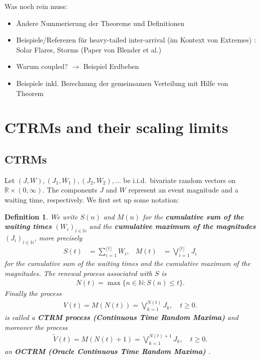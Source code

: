\documentclass[12pt, a4paper]{article}
\newtheorem{definition}[equation]{Definition}
\newcommand{\N}{\mathbb{N}}
\newcommand{\1}{\mathbf 1}
\begin{document}
Was noch rein muss:\\
\begin{itemize}
	\item Ändere Nummerierung der Theoreme und Definitionen 
	\item Beispiele/Referezen für heavy-tailed inter-arrival (im Kontext von Extremes) : Solar Flares, Storms (Paper von Blender et al.)
	\item Warum coupled? $\longrightarrow$ Beispiel Erdbeben
	\item Beispiele inkl. Berechnung der gemeinsamen Verteilung mit Hilfe von Theorem
\end{itemize}

\section{CTRMs and their scaling limits}

\subsection{CTRMs}

Let $(J,W),(J_1,W_1),(J_2,W_2), \ldots$ 
be i.i.d.\ bivariate random vectors on $\mathbb R \times (0, \infty)$. 
The components $J$ and $W$ represent an event magnitude and 
a waiting time, respectively. 
We first set up some notation: 


\begin{definition}
We write $S(n)$ and $M(n)$ for the \textbf{cumulative sum of the waiting times} $(W_i)_{i \in \N}$ and the \textbf{cumulative maximum of the magnitudes} $(J_i)_{i \in \N}$, more precisely 
\begin{align}
S(t) &= \sum_{i=1}^{\lfloor t \rfloor} W_i, 
&
M(t) &= \bigvee_{i=1}^{\lfloor t \rfloor} J_i
\end{align} 
for the cumulative sum of the waiting times and the cumulative maximum of the 
magnitudes. 
The renewal process associated with $S$ is 
\begin{align} \label{eq:renewal-process}
N(t) = \max\{n \in \mathbb N: S(n) \le t\}.
\end{align}
Finally the process
\begin{align}
V(t) 
= M\left( N(t) \right) 
= \bigvee_{k=1}^{N(t)} J_k, \quad t \ge 0.
\end{align}
is called a \textbf{CTRM process (Continuous Time Random Maxima)} and moreover the process
\begin{align}
\tilde V(t) 
= M\left( N(t) + 1 \right) 
= \bigvee_{k=1}^{N(t) + 1} J_k, \quad t \ge 0.
\end{align}
an \textbf{OCTRM (Oracle Continuous Time Random Maxima)}
.
\end{definition}
\end{document}
